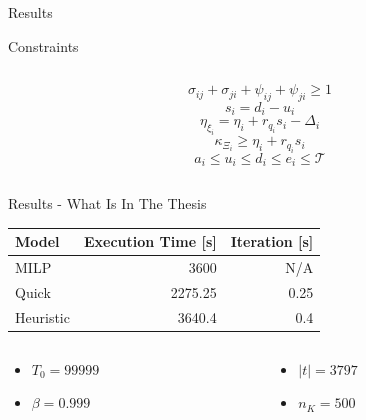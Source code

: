 \documentclass[aspectratio=169]{beamer}
\begin{document}
\begin{frame}[label={sec:org4ee59dd}]{Results}
\begin{frame}[label={sec:org88b4215}]{Constraints}
\begin{columns}
\begin{column}{0.5\columnwidth}
\begin{equation*}
    \label{seq:c4}
    \sigma_{ij} + \sigma_{ji} + \psi_{ij} + \psi_{ji} \ge 1
\end{equation*}
\begin{equation*}
    \label{seq:c5}
    s_i = d_i - u_i
\end{equation*}
\begin{equation*}
    \label{seq:c6}
     \eta_{\xi_i} = \eta_{i} + r_{q_i}s_i - \Delta_i
\end{equation*}
\begin{equation*}
    \label{seq:c7}
    \kappa_{\Xi_i} \geq \eta_{i} + r_{q_i}s_i
\end{equation*}
\begin{equation*}
    \label{seq:c8}
    a_i \leq u_i \leq d_i \le e_i \le \mathcal{T}
\end{equation*}
\end{column}
\end{columns}
\end{frame}

\begin{frame}[label={sec:org0b8fbd7}]{Results - What Is In The Thesis}
\begin{center}
\begin{tabular}{lrr}
\alert{Model} & \alert{Execution Time} [s] & \alert{Iteration} [s]\\[0pt]
\hline
MILP & 3600 & N/A\\[0pt]
Quick & 2275.25 & 0.25\\[0pt]
Heuristic & 3640.4 & 0.4\\[0pt]
\end{tabular}
\end{center}

\begin{columns}
\begin{column}{0.5\columnwidth}
\begin{itemize}
\item \(T_0 = 99999\)
\item \(\beta = 0.999\)
\end{itemize}
\end{column}
\begin{column}{0.5\columnwidth}
\begin{itemize}
\item \(|t| = 3797\)
\item \(n_K = 500\)
\end{itemize}
\end{column}
\end{columns}
\end{frame}


\end{frame}
\end{document}
